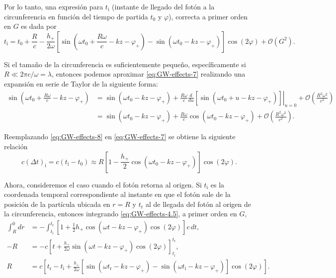 \documentclass[letterpaper,11pt]{article}
\begin{document}
Por lo tanto, una expresión para $t_{\text{i}}$ (instante de llegado del fotón a la circunferencia en función del tiempo de partida $t_0$ y $\varphi$), correcta a primer orden en $G$ es dada por
\begin{equation}
t_{\text{i}} = t_0 + \frac{R}{c} - \frac{h_{+}}{2\omega} \left[\sin\left(\omega t_0 + \frac{R\omega}{c} -kz - \varphi_{+}\right) - \sin(\omega t_{0} -kz - \varphi_{+}) \right] \cos(2\varphi) + \mathcal{O}(G^2). \label{eq:GW-effects-7}
\end{equation}

Si el tamaño de la circunferencia es suficientemente pequeño, específicamente si $R \ll 2\pi c/\omega = \lambda$, entonces podemos aproximar  \eqref{eq:GW-effects-7} realizando una expansión en serie de Taylor de la siguiente forma:
\begin{align}
\sin\left(\omega t_0 + \frac{R\omega}{c} - kz - \varphi_{+}\right) &= \sin\left(\omega t_0  - kz - \varphi_{+}\right) + \left. \frac{R\omega}{c} \frac{d}{d u} [\sin(\omega t_0 + u - kz - \varphi_{+})] \right|_{u = 0} + \mathcal{O}\left(\frac{R^2\omega^2}{c^2} \right) \nonumber \\
&= \sin\left(\omega t_0  - kz - \varphi_{+}\right) +  \frac{R\omega}{c} \cos(\omega t_0  - kz - \varphi_{+})  + \mathcal{O}\left(\frac{R^2\omega^2}{c^2} \right) . \label{eq:GW-effects-8}
\end{align}

Reemplazando \eqref{eq:GW-effects-8} en \eqref{eq:GW-effects-7} se obtiene la siguiente relación
\begin{equation}
c(\Delta t)_{\text{i}} = c(t_{\text{i}} - t_0) \approx R \left[ 1 - \frac{h_{+}}{2} \cos(\omega t_0 - kz - \varphi_{+} )\right] \cos(2\varphi) . \label{eq:GW-effects-9}
\end{equation}

Ahora, consideremos el caso cuando el fotón retorna al origen. Si $t_{\text{i}}$ es la coordenada temporal correspondiente al instante en que el fotón sale de la posición de la partícula ubicada en $r = R$ y $t_{\text{r}}$ al de llegada del fotón al origen de la circunferencia, entonces integrando \eqref{eq:GW-effects-4.5}, a primer orden en $G$,
\begin{align}
\int_R^0 dr &= - \int_{t_{\text{i}}}^{t_{\text{r}}} \left[1 + \frac{1}{2} h_{+} \cos(\omega t -kz - \varphi_{+})\cos(2\varphi) \right] c \,dt, \\
-R &= - c \left[t + \frac{h_{+}}{2\omega}  \sin(\omega t -kz - \varphi_{+})\cos(2\varphi)\right]_{t_{\text{i}}}^{t_{\text{r}}}, \\
R &= c \left[t_{\text{r}} - t_{\text{i}} + \frac{h_{+}}{2\omega}\left[\sin(\omega t_{\text{r}} -kz - \varphi_{+}) - \sin(\omega t_{\text{i}} -kz - \varphi_{+})\right]\cos(2\varphi)\right].
\end{align}
\end{document}
